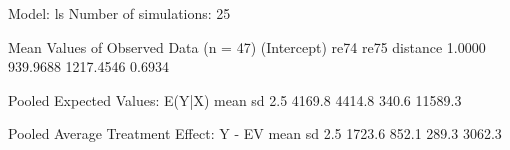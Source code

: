\begin{enumerate}
\begin{Schunk}
\begin{Soutput}
  Model: ls 
  Number of simulations: 25 

Mean Values of Observed Data (n = 47) 
(Intercept)        re74        re75    distance 
     1.0000    939.9688   1217.4546      0.6934 

Pooled Expected Values: E(Y|X)
   mean      sd    2.5%   97.5% 
 4169.8  4414.8   340.6 11589.3 

Pooled Average Treatment Effect: Y - EV
  mean     sd   2.5%  97.5% 
1723.6  852.1  289.3 3062.3 


\end{Soutput}
\end{Schunk}
  
%
\end{enumerate}

